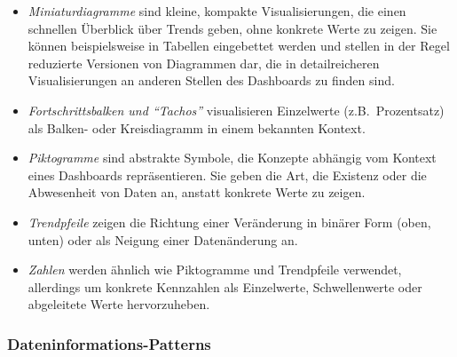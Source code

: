 \begin{itemize}
    \item \emph{Miniaturdiagramme} sind kleine, kompakte Visualisierungen, die einen schnellen Überblick über Trends geben, ohne konkrete Werte zu zeigen.
    Sie können beispielsweise in Tabellen eingebettet werden und stellen in der Regel reduzierte Versionen von Diagrammen dar, die in detailreicheren Visualisierungen an anderen Stellen des Dashboards zu finden sind.
    \item \emph{Fortschrittsbalken und "`Tachos"'} visualisieren Einzelwerte (z.B.\ Prozentsatz) als Balken- oder Kreisdiagramm in einem bekannten Kontext.
    \item \emph{Piktogramme} sind abstrakte Symbole, die Konzepte abhängig vom Kontext eines Dashboards repräsentieren.
    Sie geben die Art, die Existenz oder die Abwesenheit von Daten an, anstatt konkrete Werte zu zeigen.
    \item \emph{Trendpfeile} zeigen die Richtung einer Veränderung in binärer Form (oben, unten) oder als Neigung einer Datenänderung an.
    \item \emph{Zahlen} werden ähnlich wie Piktogramme und Trendpfeile verwendet, allerdings um konkrete Kennzahlen als Einzelwerte, Schwellenwerte oder abgeleitete Werte hervorzuheben.
\end{itemize}

\subsubsection{Dateninformations-Patterns}\label{subsubsec:data-information-patterns}


